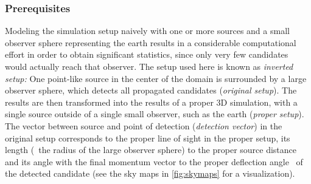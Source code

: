 \subsubsection*{Prerequisites}
Modeling the simulation setup naively with one or more sources and a
small observer sphere representing the earth results in a considerable
computational effort in order to obtain significant statistics,
since only very few candidates would actually reach that observer. The setup
used here is known as \emph{inverted setup:} One point-like source in the
center of the domain is surrounded by a large observer sphere, which detects
all propagated candidates (\emph{original setup}). The results are then
transformed into the results of a proper 3D simulation, with a single source
outside of a single small observer, such as the earth (\emph{proper setup}).
The vector between source and point of detection (\emph{detection vector}) in
the original setup corresponds to the proper line of sight in the proper setup,
its length (\ie~the radius of the large observer sphere) to the proper source
distance and its angle with the final momentum vector to the proper deflection
angle \ablenkung~of the detected candidate (see the sky maps in
\cref{fig:skymaps} for a visualization).


